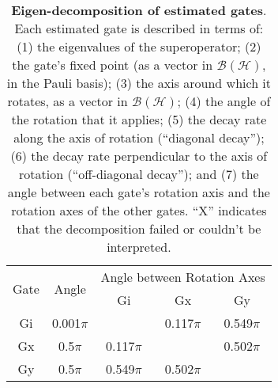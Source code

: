 \documentclass{article}[11pt]
\begin{document}
\begin{table}[h]
\begin{center}
\vspace{2em}
\begin{tabular}[l]{|c|c|c|c|c|}
\hline
\multirow{2}{*}{Gate} & \multirow{2}{*}{Angle} & \multicolumn{3}{c|}{Angle between Rotation Axes} \\ \cline{3-5}
 & & Gi & Gx & Gy \\ \hline
Gi & 0.001$\pi$ &  & 0.117$\pi$ & 0.549$\pi$ \\ \hline
Gx & 0.5$\pi$ & 0.117$\pi$ &  & 0.502$\pi$ \\ \hline
Gy & 0.5$\pi$ & 0.549$\pi$ & 0.502$\pi$ &  \\ \hline
\end{tabular}

\caption{\textbf{Eigen-decomposition of estimated gates}.  Each estimated gate is described in terms of: (1) the eigenvalues of the superoperator; (2) the gate's fixed point (as a vector in $\mathcal{B}(\mathcal{H})$, in the Pauli basis); (3)  the axis around which it rotates, as a vector in $\mathcal{B}(\mathcal{H})$; (4) the angle of the rotation that it applies; (5) the decay rate along the axis of rotation (``diagonal decay''); (6) the decay rate perpendicular to the axis of rotation (``off-diagonal decay''); and (7) the angle between each gate's rotation axis and the rotation axes of the other gates.  ``X'' indicates that the decomposition failed or couldn't be interpreted. \label{bestGatesetDecompTable}}
\end{center}
\end{table}


\end{document}
